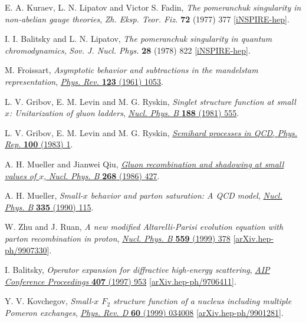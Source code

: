 \documentclass[12pt]{article}
\begin{document}
\begin{thebibliography}{99}
E. A. Kuraev, L. N. Lipatov and Victor S. Fadin, \emph{The pomeranchuk singularity in non-abelian gauge theories}, \emph{Zh. Eksp. Teor. Fiz.} {\bf 72} (1977) 377 [\href{https://inspirehep.net/literature/123995}{iNSPIRE-hep}].

I. I. Balitsky and L. N. Lipatov, \emph{The pomeranchuk singularity in quantum chromodynamics}, \emph{Sov. J. Nucl. Phys.} {\bf 28} (1978) 822 [\href{https://inspirehep.net/literature/137229}{iNSPIRE-hep}].

M. Froissart, \emph{Asymptotic behavior and subtractions in the mandelstam representation}, \href{https://doi.org/10.1103/PhysRev.123.1053}{\emph{Phys. Rev.} {\bf 123} (1961) 1053}.

L. V. Gribov, E. M. Levin and M. G. Ryskin, \emph{Singlet structure function at small $x$: Unitarization of gluon ladders}, \href{https://doi.org/10.1016/0550-3213(81)90007-9}{\emph{Nucl. Phys. B} {\bf 188} (1981) 555}.

L. V. Gribov, E. M. Levin and M. G. Ryskin, \href{https://doi.org/10.1016/0370-1573(83)90022-4}{\emph{Semihard processes in QCD}, \emph{Phys. Rep.} {\bf 100} (1983) 1}.

A. H. Mueller and Jianwei Qiu, \href{https://doi.org/10.1016/0550-3213(86)90164-1}{\emph{Gluon recombination and shadowing at small values of $x$}, \emph{Nucl. Phys. B} {\bf 268} (1986) 427}.

A. H. Mueller, \emph{Small-$x$ behavior and parton saturation: A QCD model}, \href{https://doi.org/10.1016/0550-3213(90)90173-B}{\emph{Nucl. Phys. B} {\bf 335} (1990) 115}.

W. Zhu and J. Ruan, \emph{A new modified Altarelli-Parisi evolution equation with parton recombination in proton}, \href{https://doi.org/10.1016/S0550-3213(99)00461-7}{\emph{Nucl. Phys. B} {\bf 559} (1999) 378} [\href{https://doi.org/10.48550/arXiv.hep-ph/9907330}{arXiv.hep-ph/9907330}].

I. Balitsky, \emph{Operator expansion for diffractive high-energy scattering}, \href{https://doi.org/10.1063/1.53693}{\emph{AIP Conference Proceedings} {\bf 407} (1997) 953} [\href{https://doi.org/10.48550/arXiv.hep-ph/9706411}{arXiv.hep-ph/9706411}].

Y. V. Kovchegov, \emph{Small-$x$ $F_2$ structure function of a nucleus including multiple Pomeron exchanges}, \href{https://doi.org/10.1103/PhysRevD.60.034008}{\emph{Phys. Rev. D} {\bf 60} (1999) 034008} [\href{https://doi.org/10.48550/arXiv.hep-ph/9901281}{arXiv.hep-ph/9901281}].


\end{thebibliography}
\end{document}
